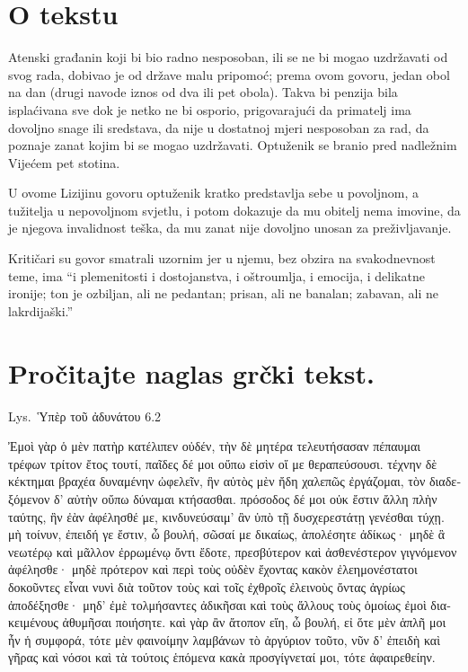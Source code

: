 


\section*{O tekstu}

Atenski građanin koji bi bio radno nesposoban, ili se ne bi mogao uzdržavati od svog rada, dobivao je od države malu pripomoć; prema ovom govoru, jedan obol na dan (drugi navode iznos od dva ili pet obola). Takva bi penzija bila isplaćivana sve dok je netko ne bi osporio, prigovarajući da primatelj ima dovoljno snage ili sredstava, da nije u dostatnoj mjeri nesposoban za rad, da poznaje zanat kojim bi se mogao uzdržavati. Optuženik se branio pred nadležnim Vijećem pet stotina.

U ovome Lizijinu govoru optuženik kratko predstavlja sebe u povoljnom, a tužitelja u nepovoljnom svjetlu, i potom dokazuje da mu obitelj nema imovine, da je njegova invalidnost teška, da mu zanat nije dovoljno unosan za preživljavanje.

Kritičari su govor smatrali uzornim jer u njemu, bez obzira na svakodnevnost teme, ima ``i plemenitosti i dostojanstva, i oštroumlja, i emocija, i delikatne ironije; ton je ozbiljan, ali ne pedantan; prisan, ali ne banalan; zabavan, ali ne lakrdijaški.''


\section*{Pročitajte naglas grčki tekst.}

Lys.\ Ὑπὲρ τοῦ ἀδυνάτου 6.2

\medskip

{\large
\begin{greek}
\noindent Ἐμοὶ γὰρ ὁ μὲν πατὴρ κατέλιπεν οὐδέν, τὴν δὲ μητέρα τελευτήσασαν πέπαυμαι τρέφων τρίτον ἔτος τουτί, παῖδες δέ μοι οὔπω εἰσὶν οἵ με θεραπεύσουσι. τέχνην δὲ κέκτημαι βραχέα δυναμένην ὠφελεῖν, ἣν αὐτὸς μὲν ἤδη χαλεπῶς ἐργάζομαι, τὸν διαδεξόμενον δ' αὐτὴν οὔπω δύναμαι κτήσασθαι. πρόσοδος δέ μοι οὐκ ἔστιν ἄλλη πλὴν ταύτης, ἣν ἐὰν ἀφέλησθέ με, κινδυνεύσαιμ' ἂν ὑπὸ τῇ δυσχερεστάτῃ γενέσθαι τύχῃ. μὴ τοίνυν, ἐπειδή γε ἔστιν, ὦ βουλή, σῶσαί με δικαίως, ἀπολέσητε ἀδίκως· μηδὲ ἃ νεωτέρῳ καὶ μᾶλλον ἐρρωμένῳ ὄντι ἔδοτε, πρεσβύτερον καὶ ἀσθενέστερον γιγνόμενον ἀφέλησθε· μηδὲ πρότερον καὶ περὶ τοὺς οὐδὲν ἔχοντας κακὸν ἐλεημονέστατοι δοκοῦντες εἶναι νυνὶ διὰ τοῦτον τοὺς καὶ τοῖς ἐχθροῖς ἐλεινοὺς ὄντας ἀγρίως ἀποδέξησθε· μηδ' ἐμὲ τολμήσαντες ἀδικῆσαι καὶ τοὺς ἄλλους τοὺς ὁμοίως ἐμοὶ διακειμένους ἀθυμῆσαι ποιήσητε. καὶ γὰρ ἂν ἄτοπον εἴη, ὦ βουλή, εἰ ὅτε μὲν ἁπλῆ μοι ἦν ἡ συμφορά, τότε μὲν φαινοίμην λαμβάνων τὸ ἀργύριον τοῦτο, νῦν δ' ἐπειδὴ καὶ γῆρας καὶ νόσοι καὶ τὰ τούτοις ἑπόμενα κακὰ προσγίγνεταί μοι, τότε ἀφαιρεθείην.

\end{greek}
}

